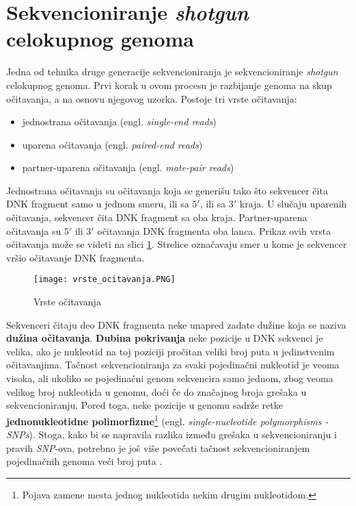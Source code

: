 \documentclass[12pt,oneside]{memoir}
\begin{document}
\section{Sekvencioniranje \textit{shotgun} celokupnog genoma}

Jedna od tehnika druge generacije sekvencioniranja je  sekvencioniranje \textit{shotgun} celokupnog genoma. Prvi korak u ovom procesu je razbijanje genoma na skup očitavanja, a na osnovu njegovog uzorka. Postoje tri vrste očitavanja:

\begin{itemize}
\itemsep0em 
    \item {jednostrana očitavanja (engl. \textit{single-end reads})}
    \item {uparena očitavanja (engl. \textit{paired-end reads})}
    \item{partner-uparena očitavanja} (engl. \textit{mate-pair reads})
\end{itemize}

Jednostrana očitavanja su očitavanja koja se generišu tako što sekvencer čita DNK fragment samo u jednom smeru, ili sa $5'$, ili sa $3'$ kraja. U slučaju uparenih očitavanja, sekvencer čita DNK fragment sa oba kraja. Partner-uparena očitavanja su $5'$ ili $3'$ očitavanja DNK fragmenta oba lanca. Prikaz ovih vrsta očitavanja može se videti na slici \ref{fig:01}. Strelice označavaju smer u kome je sekvencer vršio očitavanje DNK fragmenta.

\begin{figure}[!ht]
  \centering
  \texttt{[image: vrste\_ocitavanja.PNG]}
  \caption{Vrste očitavanja \cite{wholeGenomeSeq}}
  \label{fig:01}
\end{figure}

Sekvenceri čitaju deo DNK fragmenta neke unapred
zadate dužine koja se naziva \textbf{dužina očitavanja}. \textbf{Dubina pokrivanja} neke pozicije u DNK sekvenci je velika, ako je nukleotid na toj poziciji pročitan veliki broj puta u jedinstvenim očitavanjima. Tačnost sekvencioniranja za svaki pojedinačni nukleotid je veoma visoka, ali ukoliko se pojedinačni genom sekvencira samo jednom, zbog veoma velikog broj nukleotida u genomu, doći ć́e do značajnog broja grešaka u sekvencioniranju. Pored toga, neke pozicije u genomu sadrže retke \textbf{jednonukleotidne polimorfizme}\footnote{Pojava zamene mesta jednog nukleotida nekim drugim nukleotidom.} (engl. \textit{single-nucleotide polymorphisms - SNPs}). Stoga, kako bi se napravila razlika između grešaka u sekvencioniranju i pravih \textit{SNP}-ova, potrebno je još više poveć́ati tačnost sekvencioniranjem pojedinačnih genoma veći broj puta \cite{SequencingCoverage}.
\end{document}
